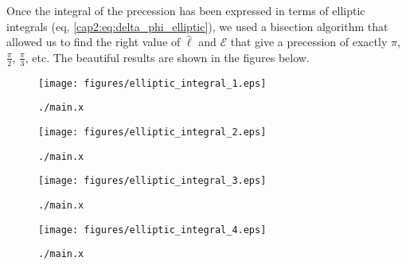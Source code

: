 \label{app:beautiful}

Once the integral of the precession has been expressed in terms of elliptic
integrals (eq, \ref{cap2:eq:delta_phi_elliptic}), we used a bisection algorithm
that allowed us to find the right value of $\hat \ell$ and
$\mathcal E$ that give a precession of exactly $\pi$, $\frac{\pi}{2}$,
$\frac{\pi}{3}$, etc.
The beautiful results are shown in the figures below.

\begin{figure}[H]
    \centering
    \texttt{[image: figures/elliptic\_integral\_1.eps]}
    \caption{\texttt{./main.x }}
    \label{cap2:fig:wow1}
\end{figure}

\begin{figure}[H]
    \centering
    \texttt{[image: figures/elliptic\_integral\_2.eps]}
    \caption{\texttt{./main.x }}
    \label{cap2:fig:wow2}
\end{figure}

\begin{figure}[H]
    \centering
    \texttt{[image: figures/elliptic\_integral\_3.eps]}
    \caption{\texttt{./main.x }}
    \label{cap2:fig:wow3}
\end{figure}

\begin{figure}[H]
    \centering
    \texttt{[image: figures/elliptic\_integral\_4.eps]}
    \caption{\texttt{./main.x }}
    \label{cap2:fig:wow4}
\end{figure}
